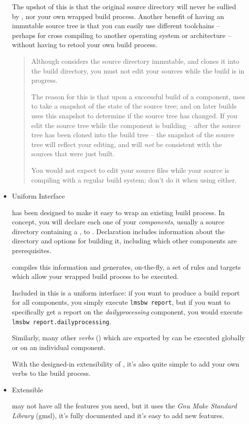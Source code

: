 \begin{itemize}
  The upshot of this is that the original source directory will never
  be sullied by \lmsbw, nor your own wrapped build process.  Another
  benefit of having an immutable source tree is that you can easily
  use different toolchains -- perhaps for cross compiling to another
  operating system or architecture -- without having to retool your
  own build process.

  \begin{quotation}
    Although \lmsbw considers the source directory immutable, and
    clones it into the build directory, you must not edit your sources
    while the build is in progress.

    The reason for this is that upon a successful build of a
    component, \lmsbw uses \mtree to take a snapshot of the state of
    the source tree; and on later builds uses this snapshot to
    determine if the source tree has changed.  If you edit the source
    tree while the component is building -- after the source tree has
    been cloned into the build tree -- the snapshot of the source tree
    will reflect your editing, and will \emph{not} be consistent with
    the sources that were just built.

    You would not expect to edit your source files while your source
    is compiling with a regular build system; don't do it when using
    \lmsbw either.
  \end{quotation}

\item Uniform Interface

  \lmsbw has been designed to make it easy to wrap an existing build
  process.  In concept, you will declare each one of your
  \emph{components}, usually a source directory containing a
  \makefile, to \lmsbw.  Declaration includes information about the
  directory and options for building it, including which other
  components are prerequisites.

  \lmsbw compiles this information and generates, on-the-fly, a set of
  \make rules and targets which allow your wrapped build process to be
  executed.

  Included in this is a uniform interface: if you want to produce a
  build report for all components, you simply execute \texttt{lmsbw
    report}, but if you want to specifically get a report on the
  \emph{dailyprocessing} component, you would execute \texttt{lmsbw
    report.dailyprocessing}.

  Similarly, many other \emph{verbs} () which
  are exported by \lmsbw can be executed globally or on an individual
  component.

  With the designed-in extensibility of \lmsbw, it's also quite simple
  to add your own verbs to the build process.

\item Extensible

  \lmsbw may not have all the features you need, but it uses the
  \emph{Gnu Make Standard Library} (gmsl), it's fully documented and
  it's easy to add new features.

\end{itemize}

